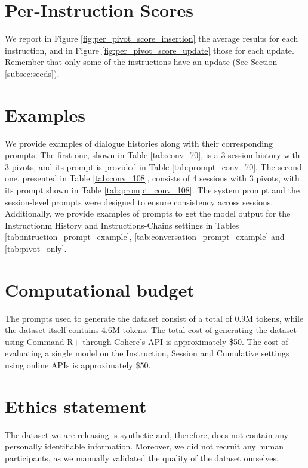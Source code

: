 \section{Per-Instruction Scores}
\label{app:per_instruction_scores}
We report in Figure \ref{fig:per_pivot_score_insertion} the average results for each instruction, and in 
Figure \ref{fig:per_pivot_score_update} those for each update. Remember that only some of the instructions have an update (See Section \ref{subsec:seeds}).

\section{Examples}
\label{app:examples}
We provide examples of dialogue histories along with their corresponding prompts. The first one, shown in Table \ref{tab:conv_70}, is a 3-session history with 3 pivots, and its prompt is provided in Table \ref{tab:prompt_conv_70}. The second one, presented in Table \ref{tab:conv_108}, consists of 4 sessions with 3 pivots, with its prompt shown in Table \ref{tab:prompt_conv_108}. The system prompt and the session-level prompts were designed to ensure consistency across sessions. Additionally, we provide examples of prompts to get the model output for the Instructionm History and Instructions-Chains settings in Tables \ref{tab:intruction_prompt_example}, \ref{tab:conversation_prompt_example} and \ref{tab:pivot_only}.

\section{Computational budget}
\label{sec:computational_budget}
The prompts used to generate the dataset consist of a total of 0.9M tokens, while the dataset itself contains 4.6M tokens. The total cost of generating the dataset using Command R+ through Cohere's API is approximately \$50. The cost of evaluating a single model on the Instruction, Session and Cumulative settings using online APIs is approximately \$50.

\section{Ethics statement}
\label{sec:ethical statement}
The dataset we are releasing is synthetic and, therefore, does not contain any personally identifiable information. Moreover, we did not recruit any human participants, as we manually validated the quality of the dataset ourselves.





